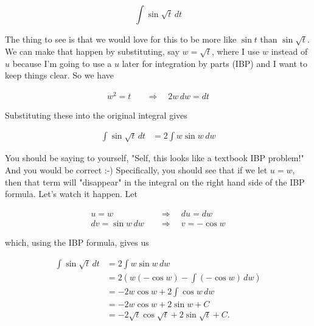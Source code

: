\documentclass[12pt, letterpaper]{article}
\begin{document}
$$ \int \sin{\sqrt{t}} \, dt $$

The thing to see is that we would love for this to be more like $\sin{t}$ than $\sin{\sqrt{t}}$. We can make that happen by substituting, say $w = \sqrt{t}$, where I use $w$ instead of $u$ because I'm going to use a $u$ later for integration by parts (IBP) and I want to keep things clear. So we have

\begin{equation*}
\begin{aligned}
w^2 = t \quad &\Rightarrow \quad 2w \,dw = dt
\end{aligned}
\end{equation*}

Substituting these into the original integral gives

\begin{equation*}
\begin{aligned}
\int \sin{\sqrt{t}} \, dt
  &= 2\int w\sin{w} \, dw
\end{aligned}
\end{equation*}

You should be saying to yourself, "Self, this looks like a textbook IBP problem!" And you would be correct :-) Specifically, you should see that if we let $u = w$, then that term will "disappear" in the integral on the right hand side of the IBP formula. Let's watch it happen. Let

\begin{equation*}
\begin{aligned}
u = w \quad &\Rightarrow \quad du = dw \\
dv = \sin{w}\, dw \quad &\Rightarrow \quad v = -\cos{w}
\end{aligned}
\end{equation*}

which, using the IBP formula, gives us

\begin{equation*}
\begin{aligned}
\int \sin{\sqrt{t}} \, dt
  &= 2\int w\sin{w} \, dw \\[0.2in]
  &= 2 \left( w \left( -\cos{w} \right) - \int \left( -\cos{w} \right) \, dw \right) \\[0.2in]
  &= -2w\cos{w} + 2\int \cos{w} \, dw \\[0.2in]
  &= -2w\cos{w} + 2 \sin{w} + C \\[0.2in]
  &= -2\sqrt{t}\cos{\sqrt{t}} + 2 \sin{\sqrt{t}} + C.
\end{aligned}
\end{equation*}
\end{document}
